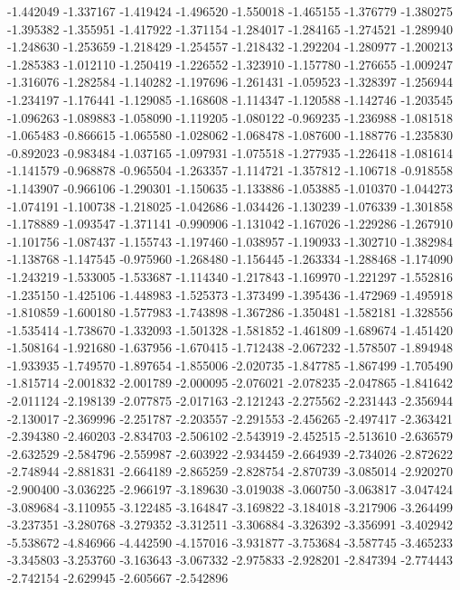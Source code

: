 -1.442049
-1.337167
-1.419424
-1.496520
-1.550018
-1.465155
-1.376779
-1.380275
-1.395382
-1.355951
-1.417922
-1.371154
-1.284017
-1.284165
-1.274521
-1.289940
-1.248630
-1.253659
-1.218429
-1.254557
-1.218432
-1.292204
-1.280977
-1.200213
-1.285383
-1.012110
-1.250419
-1.226552
-1.323910
-1.157780
-1.276655
-1.009247
-1.316076
-1.282584
-1.140282
-1.197696
-1.261431
-1.059523
-1.328397
-1.256944
-1.234197
-1.176441
-1.129085
-1.168608
-1.114347
-1.120588
-1.142746
-1.203545
-1.096263
-1.089883
-1.058090
-1.119205
-1.080122
-0.969235
-1.236988
-1.081518
-1.065483
-0.866615
-1.065580
-1.028062
-1.068478
-1.087600
-1.188776
-1.235830
-0.892023
-0.983484
-1.037165
-1.097931
-1.075518
-1.277935
-1.226418
-1.081614
-1.141579
-0.968878
-0.965504
-1.263357
-1.114721
-1.357812
-1.106718
-0.918558
-1.143907
-0.966106
-1.290301
-1.150635
-1.133886
-1.053885
-1.010370
-1.044273
-1.074191
-1.100738
-1.218025
-1.042686
-1.034426
-1.130239
-1.076339
-1.301858
-1.178889
-1.093547
-1.371141
-0.990906
-1.131042
-1.167026
-1.229286
-1.267910
-1.101756
-1.087437
-1.155743
-1.197460
-1.038957
-1.190933
-1.302710
-1.382984
-1.138768
-1.147545
-0.975960
-1.268480
-1.156445
-1.263334
-1.288468
-1.174090
-1.243219
-1.533005
-1.533687
-1.114340
-1.217843
-1.169970
-1.221297
-1.552816
-1.235150
-1.425106
-1.448983
-1.525373
-1.373499
-1.395436
-1.472969
-1.495918
-1.810859
-1.600180
-1.577983
-1.743898
-1.367286
-1.350481
-1.582181
-1.328556
-1.535414
-1.738670
-1.332093
-1.501328
-1.581852
-1.461809
-1.689674
-1.451420
-1.508164
-1.921680
-1.637956
-1.670415
-1.712438
-2.067232
-1.578507
-1.894948
-1.933935
-1.749570
-1.897654
-1.855006
-2.020735
-1.847785
-1.867499
-1.705490
-1.815714
-2.001832
-2.001789
-2.000095
-2.076021
-2.078235
-2.047865
-1.841642
-2.011124
-2.198139
-2.077875
-2.017163
-2.121243
-2.275562
-2.231443
-2.356944
-2.130017
-2.369996
-2.251787
-2.203557
-2.291553
-2.456265
-2.497417
-2.363421
-2.394380
-2.460203
-2.834703
-2.506102
-2.543919
-2.452515
-2.513610
-2.636579
-2.632529
-2.584796
-2.559987
-2.603922
-2.934459
-2.664939
-2.734026
-2.872622
-2.748944
-2.881831
-2.664189
-2.865259
-2.828754
-2.870739
-3.085014
-2.920270
-2.900400
-3.036225
-2.966197
-3.189630
-3.019038
-3.060750
-3.063817
-3.047424
-3.089684
-3.110955
-3.122485
-3.164847
-3.169822
-3.184018
-3.217906
-3.264499
-3.237351
-3.280768
-3.279352
-3.312511
-3.306884
-3.326392
-3.356991
-3.402942
-5.538672
-4.846966
-4.442590
-4.157016
-3.931877
-3.753684
-3.587745
-3.465233
-3.345803
-3.253760
-3.163643
-3.067332
-2.975833
-2.928201
-2.847394
-2.774443
-2.742154
-2.629945
-2.605667
-2.542896
